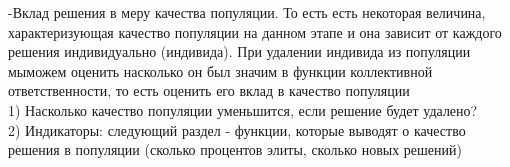 -Вклад решения в меру качества популяции. То есть есть некоторая величина, характеризующая качество популяции на данном этапе и она зависит от каждого решения индивидуально (индивида). При удалении индивида из популяции мыможем оценить насколько он был значим в функции коллективной ответственности, то есть оценить его вклад в качество популяции\\
1) Насколько качество популяции уменьшится, если решение будет удалено?\\
2) Индикаторы: следующий раздел - функции, которые выводят о качество решения в популяции (сколько процентов элиты, сколько новых решений)
